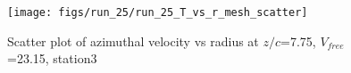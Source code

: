 \begin{figure}[H]
\centering
\texttt{[image: figs/run\_25/run\_25\_T\_vs\_r\_mesh\_scatter]}
\caption{Scatter plot of azimuthal velocity vs radius at $z/c$=7.75, $V_{free}$=23.15, station3}
\label{fig:run_25_T_vs_r_mesh_scatter}
\end{figure}


